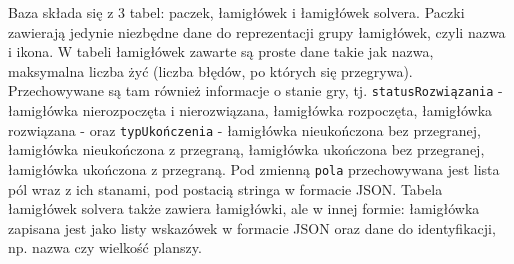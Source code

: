 	Baza składa się z 3 tabel: paczek, łamigłówek i łamigłówek solvera. Paczki zawierają jedynie
niezbędne dane do reprezentacji grupy łamigłówek, czyli nazwa i ikona. W tabeli łamigłówek zawarte
są proste dane takie jak nazwa, maksymalna liczba żyć (liczba błędów, po których się przegrywa).
Przechowywane są tam również informacje o stanie gry, tj. \texttt{statusRozwiązania} - łamigłówka
nierozpoczęta i nierozwiązana, łamigłówka rozpoczęta, łamigłówka rozwiązana - oraz \texttt{typUkończenia} - 
łamigłówka nieukończona bez przegranej, łamigłówka nieukończona z przegraną, łamigłówka ukończona
bez przegranej, łamigłówka ukończona z przegraną. Pod zmienną \texttt{pola} przechowywana jest lista
pól wraz z ich stanami, pod postacią stringa w formacie JSON. Tabela łamigłówek solvera także zawiera
łamigłówki, ale w innej formie: łamigłówka zapisana jest jako listy wskazówek w formacie JSON oraz dane
do identyfikacji, np. nazwa czy wielkość planszy.
